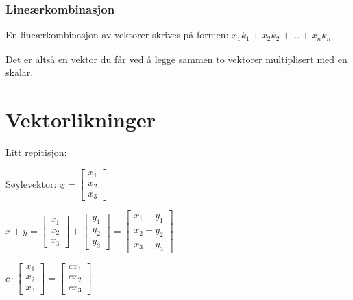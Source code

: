 \documentclass[11pt, a4paper, norsk]{article}
\begin{document}
        \subsubsection{Lineærkombinasjon}
        
        En lineærkombinasjon av vektorer skrives på formen:
        $\underline{x_1}k_1 + \underline{x_2}k_2 + \dots + \underline{x_n}k_{n}$

        Det er altså en vektor du får ved å legge sammen to vektorer multiplisert med en skalar. 
        
        \newpage
       \section{Vektorlikninger}
        
       Litt repitisjon:

       Søylevektor: $\underline{x} = \begin{bmatrix}
           x_1 \\
           x_2 \\
           x_3
       \end{bmatrix}$

       $\underline{x} + \underline{y} = \begin{bmatrix}
           x_1 \\
           x_2 \\
           x_3
       \end{bmatrix} + \begin{bmatrix}
           y_1 \\
           y_2 \\
           y_3
       \end{bmatrix} = \begin{bmatrix}
           x_1 + y_1 \\
           x_2 + y_2 \\
           x_3 + y_3
       \end{bmatrix}$

       $c \cdot \begin{bmatrix}
           x_1 \\
           x_2 \\
           x_3
       \end{bmatrix} = \begin{bmatrix}
           cx_1 \\
           cx_2 \\
           cx_3
       \end{bmatrix}$ 
\end{document}
